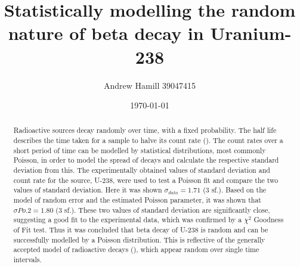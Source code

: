 \documentclass[11pt]{article}
\begin{document}
    \title{Statistically modelling the random nature of beta decay in Uranium-238}
    \author{Andrew Hamill 39047415}
    \date{\today}
    \maketitle

    \begin{abstract}
    \normalsize Radioactive sources decay randomly over time, with a fixed probability. The half life describes the time taken for a sample to halve its count rate (\cite{YF}). The count rates over a short period of time can be modelled by statistical distributions, most commonly Poisson, in order to model the spread of decays and calculate the respective standard deviation from this. The experimentally obtained values of standard deviation and count rate for the source, U-238, were used to test a Poisson fit and compare the two values of standard deviation. Here it was shown $\sigma_{data} = 1.71$ (3 sf.). Based on the model of random error and the estimated Poisson parameter, it was shown that $\sigma{Po.2} = 1.80$ (3 sf.). These two values of standard deviation are significantly close, suggesting a good fit to the experimental data, which was confirmed by a $\chi^{2}$ Goodness of Fit test. Thus it was concluded that beta decay of U-238 is random and can be successfully modelled by a Poisson distribution. This is reflective of the generally accepted model of radioactive decays (\cite{YF}), which appear random over single time intervals.  
    \end{abstract}
\end{document}
